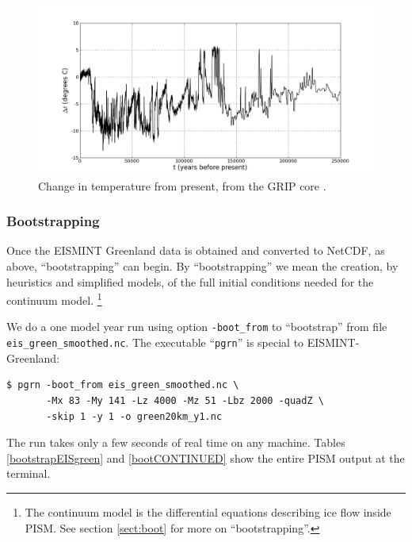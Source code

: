 \documentclass[11pt,final]{amsart}
\begin{document}
\begin{figure}[ht]
\includegraphics[width=5.6in,keepaspectratio=true]{figs/gripDeltaT}
\caption{Change in temperature from present, from the GRIP core \cite{JohnsonetalGRIP}.}
\label{fig:gripDeltaT}
\end{figure}


\subsubsection*{Bootstrapping}  \label{sect:green-bootstrapping}  Once the EISMINT Greenland data is obtained and converted to NetCDF, as above, ``bootstrapping'' can begin.  By ``bootstrapping'' we mean the creation, by heuristics and simplified models, of the full initial conditions needed for the continuum model.  \footnote{The continuum model is the differential equations describing ice flow inside PISM.  See section \ref{sect:boot} for more on ``bootstrapping''.}

We do a one model year run using option \verb|-boot_from| to ``bootstrap'' from file \verb|eis_green_smoothed.nc|.  The executable ``\verb|pgrn|'' is special to EISMINT-Greenland:
\begin{verbatim}
$ pgrn -boot_from eis_green_smoothed.nc \
       -Mx 83 -My 141 -Lz 4000 -Mz 51 -Lbz 2000 -quadZ \
       -skip 1 -y 1 -o green20km_y1.nc
\end{verbatim}
\noindent The run takes only a few seconds of real time on any machine.  Tables \ref{bootstrapEISgreen} and \ref{bootCONTINUED} show the entire PISM output at the terminal.
\end{document}
